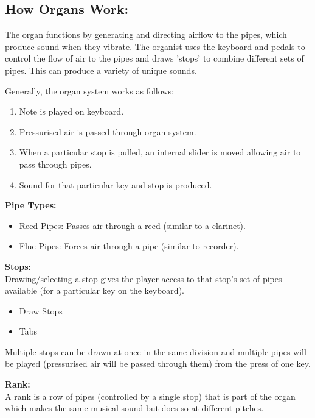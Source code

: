 \noindent \subsection{How Organs Work:}
\hspace{0.5cm} The organ functions by generating and directing airflow to the pipes, which produce sound when they vibrate. The organist uses the keyboard and pedals to control the flow of air to the pipes and draws 'stops' to combine different sets of pipes. This can produce a variety of unique sounds.

\noindent Generally, the organ system works as follows:
\begin{enumerate}
\item Note is played on keyboard.
\item Pressurised air is passed through organ system.
\item When a particular stop is pulled, an internal slider is moved allowing air to pass through pipes.
\item Sound for that particular key and stop is produced.
\end{enumerate}

\noindent \textbf{Pipe Types:}
\begin{itemize}
\item \underline{Reed Pipes}: Passes air through a reed (similar to a clarinet).
\item \underline{Flue Pipes}: Forces air through a pipe (similar to recorder).
\end{itemize}

\noindent \textbf{Stops:}
\\ \hspace*{0.5cm}Drawing/selecting a stop gives the player access to that stop's set of pipes available (for a particular key on the keyboard). 
\begin{itemize}
\item Draw Stops
\item Tabs
\end{itemize}

Multiple stops can be drawn at once in the same division and multiple pipes will be played (pressurised air will be passed through them) from the press of one key.  

\medskip
\noindent \textbf{Rank:}
\\ \hspace*{0.5cm} A rank is a row of pipes (controlled by a single stop) that is part of the organ which makes the same musical sound but does so at different pitches. 

